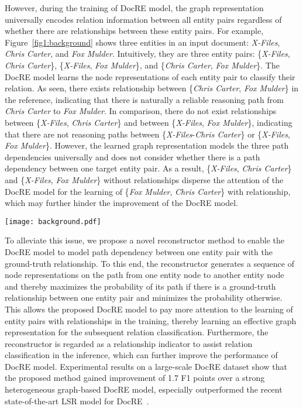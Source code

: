 \documentclass[letterpaper]{article} \usepackage{aaai21}  \usepackage{times}  \usepackage{helvet} \usepackage{courier}  \usepackage[hyphens]{url}  \usepackage{graphicx} \urlstyle{rm} \def\UrlFont{\rm}  \usepackage{natbib}  \usepackage{caption} \frenchspacing  \setlength{\pdfpagewidth}{8.5in}  \setlength{\pdfpageheight}{11in}  \usepackage{amsmath}
\begin{document}
However, during the training of DocRE model, the graph representation universally encodes relation information between all entity pairs regardless of whether there are relationships between these entity pairs.
For example, Figure~\ref{fig1:background} shows three entities in an input document: \textit{X-Files}, \textit{Chris Carter}, and \textit{Fox Mulder}.
Intuitively, they are three entity pairs: \{\textit{X-Files}, \textit{Chris Carter}\}, \{\textit{X-Files}, \textit{Fox Mulder}\}, and \{\textit{Chris Carter}, \textit{Fox Mulder}\}.
The DocRE model learns the node representations of each entity pair to classify their relation.
As seen, there exists relationship between \{\textit{Chris Carter}, \textit{Fox Mulder}\} in the reference, indicating that there is naturally a reliable reasoning path from \textit{Chris Carter} to \textit{Fox Mulder}.
In comparison, there do not exist relationships between \{\textit{X-Files}, \textit{Chris Carter}\} and between \{\textit{X-Files}, \textit{Fox Mulder}\}, indicating that there are not reasoning paths between \{\textit{X-Files}-\textit{Chris Carter}\} or \{\textit{X-Files}, \textit{Fox Mulder}\}.
However, the learned graph representation models the three path dependencies universally and does not consider whether there is a path dependency between one target entity pair.
As a result, \{\textit{X-Files}, \textit{Chris Carter}\} and \{\textit{X-Files}, \textit{Fox Mulder}\} without relationships disperse the attention of the DocRE model for the learning of \{\textit{Fox Mulder}, \textit{Chris Carter}\} with relationship, which may further hinder the improvement of the DocRE model.
\begin{figure*}[!ht]
\centering
\texttt{[image: background.pdf]} \caption{Heuristic rules are used to convert the input document into a heterogeneous graph. Then graph attention network is applied to learn the graph representation. Finally the node representations of entity pairs are used to classify their relationships.}
\label{fig1:background}
\end{figure*}

To alleviate this issue, we propose a novel reconstructor method to enable the DocRE model to model path dependency between one entity pair with the ground-truth relationship.
To this end, the reconstructor generates a sequence of node representations on the path from one entity node to another entity node and thereby maximizes the probability of its path if there is a ground-truth relationship between one entity pair and minimizes the probability otherwise.
This allows the proposed DocRE model to pay more attention to the learning of entity pairs with relationships in the training, thereby learning an effective graph representation for the subsequent relation classification.
Furthermore, the reconstructor is regarded as a relationship indicator to assist relation classification in the inference, which can further improve the performance of DocRE model.
Experimental results on a large-scale DocRE dataset show that the proposed method gained improvement of 1.7 F1 points over a strong heterogeneous graph-based DocRE model, especially outperformed the recent state-of-the-art LSR model for DocRE~\cite{Nan2020ReasoningWL}.
\end{document}
